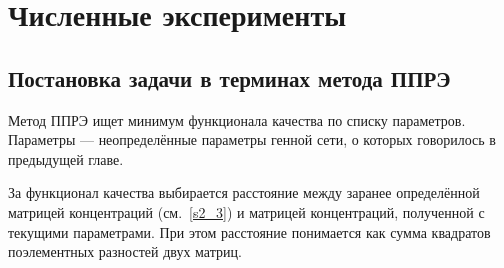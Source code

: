 \section{Численные эксперименты} \label{s3}

\subsection{Постановка задачи в терминах метода ППРЭ} \label{s3_1}

Метод ППРЭ ищет минимум функционала качества по списку параметров. Параметры — 
неопределённые параметры генной сети, о которых говорилось в предыдущей главе. 

За функционал качества выбирается расстояние между заранее определённой матрицей 
концентраций (см.~\ref{s2_3}) и матрицей концентраций, полученной с текущими 
параметрами. При этом расстояние понимается как сумма квадратов поэлементных 
разностей двух матриц.

\clearpage
